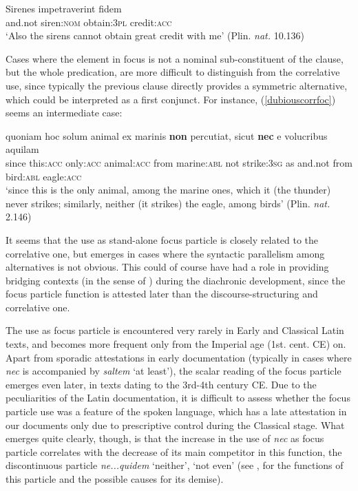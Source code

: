 \documentclass[output=paper,modfonts,nonflat,citecolor=brown,
showindex
]{langsci/langscibook}
\begin{document}
{\begin{exe}
\ex \label{focussirens}  Sirenes impetraverint fidem\\
and.not siren:{\textsc{nom}} obtain:{\textsc{3pl}} credit:{\textsc{acc}}\\

`Also the sirens cannot obtain great credit with me' (Plin. {\emph{nat.}} 10.136)
\end{exe}}

\noindent Cases where the element in focus is not a nominal sub-constituent of the clause, but the whole predication, are more difficult to distinguish from the correlative use, since typically the previous clause directly provides a symmetric alternative, which could be interpreted as a first conjunct. For instance, (\ref{dubiouscorrfoc}) seems an intermediate case:

{\begin{exe}
\ex \label{dubiouscorrfoc} \gll quoniam hoc solum animal ex marinis {\textbf{non}} percutiat, sicut {\textbf{nec}} e volucribus aquilam\\
since this:{\textsc{acc}} only:{\textsc{acc}} animal:{\textsc{acc}} from marine:{\textsc{abl}} not strike:{\textsc{3sg}} as and.not from bird:{\textsc{abl}} eagle:{\textsc{acc}}\\

`since this is the only animal, among the marine ones, which it (the thunder) never strikes; similarly, neither (it strikes) the eagle, among birds' (Plin. {\emph{nat.}} 2.146)
\end{exe}}

\noindent It seems that the use as stand-alone focus particle is closely related to the correlative one, but emerges in cases where the syntactic parallelism among alternatives is not obvious. This could of course have had a role in providing bridging contexts (in the sense of \citealt{Heine02}) during the diachronic development, since the focus particle function is attested later than the discourse-structuring and correlative one. 

The use as focus particle is encountered very rarely in Early and Classical Latin texts, and becomes more frequent only from the Imperial age (1st. cent. CE) on. Apart from sporadic attestations in early documentation (typically in cases where {\emph{nec}} is accompanied by {\emph{saltem}} `at least'), the scalar reading of the focus particle emerges even later, in texts dating to the 3rd-4th century CE. Due to the peculiarities of the Latin documentation, it is difficult to assess whether the focus particle use was a feature of the spoken language, which has a late attestation in our documents only due to prescriptive control during the Classical stage. What emerges quite clearly, though, is that the increase in the use of {\emph{nec}} as focus particle correlates with the decrease of its main competitor in this function, the discontinuous particle {\emph{ne...quidem}} `neither', `not even' (see \citealt[chapter 7]{Orlandini01}, \citealt[]{Gianollo17} for the functions of this particle and the possible causes for its demise).
\end{document}
